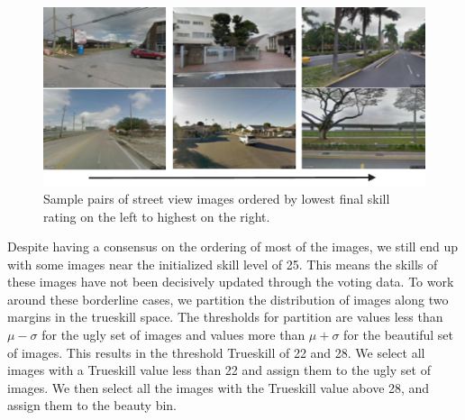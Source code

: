 \begin{figure}[t!]
    \centering
    \includegraphics[width=\columnwidth]{SkillSorting.pdf}
    \caption{Sample pairs of street view images ordered by lowest final skill rating on the left to highest on the right. }
    \label{fig:trueskill_example}
\end{figure}
Despite having a consensus on the ordering of most of the images, we still end up with some images near the initialized skill level of 25. This means the skills of these images have not been decisively updated through the voting data. To work around these borderline cases, we partition the distribution of images along two margins in the trueskill space. The thresholds for partition are values less than $\mu - \sigma$ for the ugly set of images and values more than $\mu + \sigma$ for the beautiful set of images. This results in the threshold Trueskill of 22 and 28.
We select all images with a Trueskill value less than 22 and assign them to the ugly set of images. We then select all the images with the Trueskill value above 28, and assign them to the beauty bin.


